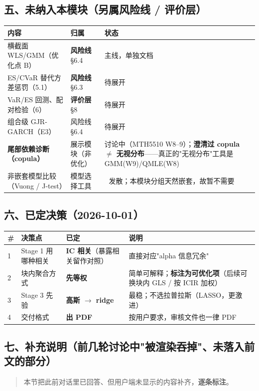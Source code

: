 \documentclass[11pt]{article}
\begin{document}
\subsection{\texorpdfstring{五、未纳入本模块（另属风险线 / 评价层）}{五、未纳入本模块（另属风险线 / 评价层）}}
{\small
\begin{longtable}{p{3.53cm}p{1.98cm}p{10.69cm}}
\toprule
内容 & 归属 & 状态 \\
\midrule
横截面 WLS/GMM（优化点 B） & \textbf{风险线} \S6.4 & 主线，单独文档 \\
ES/CVaR 替代方差惩罚（5.1） & \textbf{风险线} \S6.3 & 待展开 \\
VaR/ES 回测、配对检验（6） & \textbf{评价层} \S8 & 待展开 \\
组合级 GJR-GARCH（E3） & 风险线 \S6.4 & 待展开 \\
\textbf{尾部依赖诊断（copula）} & 展示模块（非优化） & 讨论中（MTH5510 W8--9）；\textbf{澄清过 copula \ensuremath{\ne} 无视分布}------真正的"无视分布"工具是 GMM(W9)/QMLE(W8) \\
非嵌套模型比较（Vuong / J-test） & 模型选择工具 & 🔴 发散；本模块分组天然嵌套，故暂不需要 \\
\bottomrule
\end{longtable}
}
\subsection{\texorpdfstring{六、已定决策（2026-10-01）}{六、已定决策（2026-10-01）}}
{\small
\begin{longtable}{p{1.25cm}p{2.36cm}p{4.06cm}p{8.52cm}}
\toprule
\# & 决策点 & 已定 & 说明 \\
\midrule
1 & Stage 1 用哪种相关 & \textbf{IC 相关}（暴露相关留作对照） & 直接对应"alpha 信息冗余" \\
2 & 块内聚合方式 & \textbf{先等权} & 简单可解释；\textbf{标注为可优化项}（后续可换块内 GLS / 按 ICIR 加权） \\
3 & Stage 3 先验 & \textbf{高斯 \ensuremath{\rightarrow} ridge} & 最稳；不选拉普拉斯（LASSO，更激进） \\
4 & 交付格式 & \textbf{出 PDF} & 按用户要求，审核文件也一律 PDF \\
\bottomrule
\end{longtable}
}
\subsection{\texorpdfstring{七、补充说明（前几轮讨论中"被渲染吞掉"、未落入前文的部分）}{七、补充说明（前几轮讨论中"被渲染吞掉"、未落入前文的部分）}}
\begin{quote}
本节把此前对话里已回答、但用户端未显示的内容补齐，\textbf{逐条标注}。
\end{quote}
\end{document}
